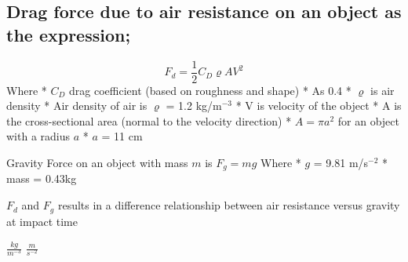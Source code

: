 \documentclass[11pt]{article}
\begin{document}
    \hypertarget{drag-force-due-to-air-resistance-on-an-object-as-the-expression}{%
\subsection{Drag force due to air resistance on an object as the
expression;}\label{drag-force-due-to-air-resistance-on-an-object-as-the-expression}}

\[
F_d =
\frac{1}{2} C_D \varrho A V^2
\] Where * \(C_D\) drag coefficient (based on roughness and shape) * As
0.4 * \(\varrho\) is air density * Air density of air is \(\varrho\) =
1.2 kg/m\(^{-3}\) * V is velocity of the object * A is the
cross-sectional area (normal to the velocity direction) *
\(A = \pi a^{2}\) for an object with a radius \(a\) * \(a\) = 11 cm

Gravity Force on an object with mass \(m\) is \(F_g = mg\) Where * \(g\)
= 9.81 m/s\(^{-2}\) * mass = 0.43kg

\(F_d\) and \(F_g\) results in a difference relationship between air
resistance versus gravity at impact time

\(\frac{kg}{m^{-3}}\) \(\frac{m}{s^{-2}}\)
\end{document}
